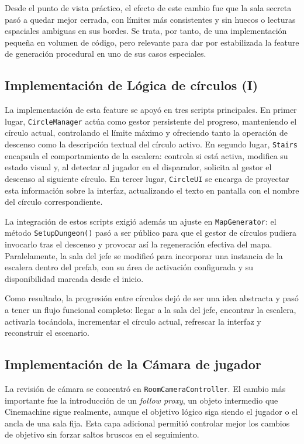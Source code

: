 Desde el punto de vista práctico, el efecto de este cambio fue que la sala secreta pasó a
quedar mejor cerrada, con límites más consistentes y sin huecos o lecturas espaciales
ambiguas en sus bordes. Se trata, por tanto, de una implementación pequeña en volumen de
código, pero relevante para dar por estabilizada la feature de generación procedural en uno
de sus casos especiales.

\subsection{Implementación de Lógica de círculos (I)}
La implementación de esta feature se apoyó en tres scripts principales. En primer lugar,
\texttt{CircleManager} actúa como gestor persistente del progreso, manteniendo el círculo
actual, controlando el límite máximo y ofreciendo tanto la operación de descenso como la
descripción textual del círculo activo. En segundo lugar, \texttt{Stairs} encapsula el
comportamiento de la escalera: controla si está activa, modifica su estado visual y, al
detectar al jugador en el disparador, solicita al gestor el descenso al siguiente círculo.
En tercer lugar, \texttt{CircleUI} se encarga de proyectar esta información sobre la
interfaz, actualizando el texto en pantalla con el nombre del círculo correspondiente.

La integración de estos scripts exigió además un ajuste en \texttt{MapGenerator}: el método
\texttt{SetupDungeon()} pasó a ser público para que el gestor de círculos pudiera invocarlo
tras el descenso y provocar así la regeneración efectiva del mapa. Paralelamente, la sala
del jefe se modificó para incorporar una instancia de la escalera dentro del prefab, con su
área de activación configurada y su disponibilidad marcada desde el inicio.

Como resultado, la progresión entre círculos dejó de ser una idea abstracta y pasó a tener
un flujo funcional completo: llegar a la sala del jefe, encontrar la escalera, activarla
tocándola, incrementar el círculo actual, refrescar la interfaz y reconstruir el escenario.

\subsection{Implementación de la Cámara de jugador}
La revisión de cámara se concentró en \texttt{RoomCameraController}. El cambio más
importante fue la introducción de un \textit{follow proxy}, un objeto intermedio que
Cinemachine sigue realmente, aunque el objetivo lógico siga siendo el jugador o el ancla de
una sala fija. Esta capa adicional permitió controlar mejor los cambios de objetivo sin
forzar saltos bruscos en el seguimiento.

